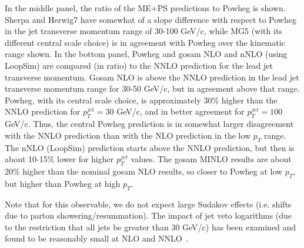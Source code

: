 In the middle panel, the ratio of the ME+PS predictions to Powheg is
shown. Sherpa and Herwig7 have somewhat of a slope difference with
respect to Powheg in the jet transverse momentum range of 30-100
GeV/c, while MG5 (with its different central scale choice) is in
agreement with Powheg over the kinematic range shown.  In the bottom
panel, Powheg and gosam NLO and nNLO (using LoopSim) are compared (in
ratio) to the NNLO prediction for the lead jet transverse
momentum. Gosam NLO is above the NNLO prediction in the lead jet
transverse momentum range for 30-50 GeV/c, but in agreement above that
range. Powheg, with its central scale choice, is approximately 30\%
higher than the NNLO prediction for $p_T^{jet}=30$ GeV/c, and in
better agreement for $p_T^{jet}=100$ GeV/c. Thus, the central Powheg
prediction is in somewhat larger disagreement with the NNLO prediction
than with the NLO prediction in the low $p_T$ range. The nNLO
(LoopSim) prediction starts above the NNLO prediction, but then is
about 10-15\% lower for higher $p_T^{jet}$ values. The gosam MINLO
results are about 20\% higher than the nominal gosam NLO results, so
closer to Powheg at low $p_T$, but higher than Powheg at high $p_T$.

Note that for this observable, we do not expect large Sudakov effects
(i.e. shifts due to parton showering/resummation). The impact of jet
veto logarithms (due to the restriction that all jets be greater than
30 GeV/c) has been examined and found to be reasonably small at NLO
and NNLO~\cite{monni}.


